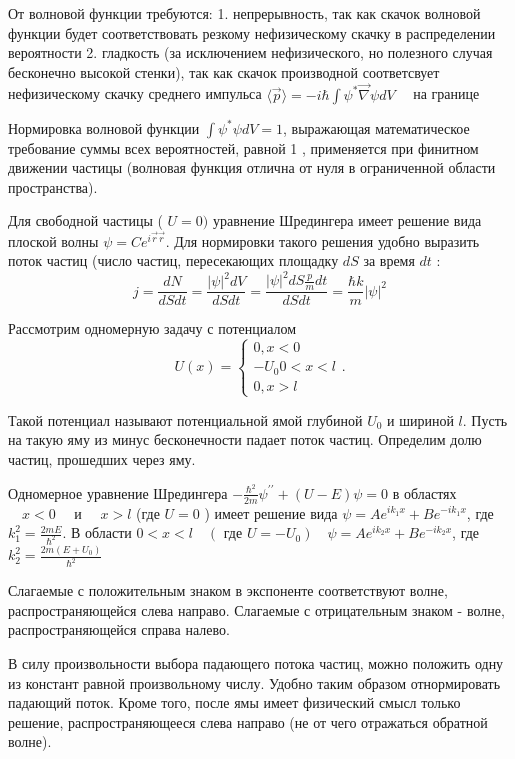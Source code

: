 \documentclass[a4paper, 12pt]{article}%
\begin{document}
	От волновой функции требуются:
	1. непрерывность, так как скачок волновой функции будет соответствовать резкому нефизическому скачку в распределении вероятности
	2. гладкость (за исключением нефизического, но полезного случая бесконечно высокой стенки), так как скачок производной соответсвует нефизическому скачку среднего импульса $\langle\vec{p}\rangle=-i \hbar \int \psi^* \vec{\nabla} \psi d V \quad$ на границе
	
	Нормировка волновой функции $\int \psi^* \psi d V=1$, выражающая математическое требование суммы всех вероятностей, равной 1 , применяется при финитном движении частицы (волновая функция отлична от нуля в ограниченной области пространства).
	
	Для свободной частицы ( $U=0)$ уравнение Шредингера имеет решение вида плоской волны $\psi=C e^{i \vec{r} \vec{r}}$. Для нормировки такого решения удобно выразить поток частиц (число частиц, пересекающих площадку $d S$ за время $d t$ :
	$$
	j=\frac{d N}{d S d t}=\frac{|\psi|^2 d V}{d S d t}=\frac{|\psi|^2 d S \frac{p}{m} d t}{d S d t}=\frac{\hbar k}{m}|\psi|^2
	$$
	
	Рассмотрим одномерную задачу с потенциалом
	$$
	U(x)=\left\{\begin{array}{c}
		0, x<0 \\
		-U_0 0<x<l \\
		0, x>l
	\end{array} .\right.
	$$
	
	Такой потенциал называют потенциальной ямой глубиной $U_0$ и шириной $l$.
	Пусть на такую яму из минус бесконечности падает поток частиц. Определим долю частиц, прошедших через яму.
	
	Одномерное уравнение Шредингера $-\frac{\hbar^2}{2 m} \psi^{\prime \prime}+(U-E) \psi=0$ в областях $\quad x<0 \quad$ и $\quad x>l$ (где $U=0$ ) имеет решение вида $\psi=A e^{i k_1 x}+B e^{-i k_1 x}$, где $k_1^2=\frac{2 m E}{\hbar^2}$. В области $0<x<l \quad\left(\right.$ где $\left.U=-U_0\right) \quad \psi=A e^{i k_2 x}+B e^{-i k_2 x}$, где $k_2^2=\frac{2 m\left(E+U_0\right)}{\hbar^2}$
	
	Слагаемые с положительным знаком в экспоненте соответствуют волне, распространяющейся слева направо. Слагаемые с отрицательным знаком - волне, распространяющейся справа налево.
	
	В силу произвольности выбора падающего потока частиц, можно положить одну из констант равной произвольному числу. Удобно таким образом отнормировать падающий поток. Кроме того, после ямы имеет физический смысл только решение, распространяющееся слева направо (не от чего отражаться обратной волне).
	
\end{document}
